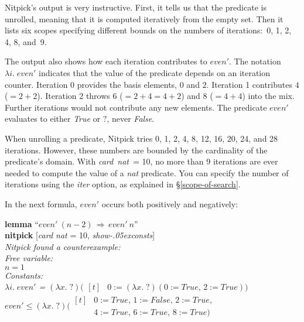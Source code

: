 \documentclass[a4paper,12pt]{article}
\def\unk{{?}}
\def\unkef{(\lambda x.\; \unk)}
\def\Q{{\smash{\lower.2ex\hbox{$\scriptstyle?$}}}}
\renewcommand\_{\hbox{\textunderscore\kern-.05ex}}
\begin{document}
Nitpick's output is very instructive. First, it tells us that the predicate is
unrolled, meaning that it is computed iteratively from the empty set. Then it
lists six scopes specifying different bounds on the numbers of iterations:\ 0,
1, 2, 4, 8, and~9.

The output also shows how each iteration contributes to $\textit{even}'$. The
notation $\lambda i.\; \textit{even}'$ indicates that the value of the
predicate depends on an iteration counter. Iteration 0 provides the basis
elements, $0$ and $2$. Iteration 1 contributes $4$ ($= 2 + 2$). Iteration 2
throws $6$ ($= 2 + 4 = 4 + 2$) and $8$ ($= 4 + 4$) into the mix. Further
iterations would not contribute any new elements.
The predicate $\textit{even}'$ evaluates to either \textit{True} or $\unk$,
never \textit{False}.


When unrolling a predicate, Nitpick tries 0, 1, 2, 4, 8, 12, 16, 20, 24, and 28
iterations. However, these numbers are bounded by the cardinality of the
predicate's domain. With \textit{card~nat}~= 10, no more than 9 iterations are
ever needed to compute the value of a \textit{nat} predicate. You can specify
the number of iterations using the \textit{iter} option, as explained in
\S\ref{scope-of-search}.

In the next formula, $\textit{even}'$ occurs both positively and negatively:

\prew
\textbf{lemma} ``$\textit{even}'~(n - 2) \,\Longrightarrow\, \textit{even}'~n$'' \\
\textbf{nitpick} [\textit{card nat} = 10, \textit{show\_consts}] \\[2\smallskipamount]
\slshape Nitpick found a counterexample: \\[2\smallskipamount]
\hbox{}\qquad Free variable: \nopagebreak \\
\hbox{}\qquad\qquad $n = 1$ \\
\hbox{}\qquad Constants: \nopagebreak \\
\hbox{}\qquad\qquad $\lambda i.\; \textit{even}'$ = $\unkef(\!\begin{aligned}[t]
& 0 := \unkef(0 := \mathit{True},\, 2 := \mathit{True}))\end{aligned}$  \\
\hbox{}\qquad\qquad $\textit{even}' \leq \unkef(\!\begin{aligned}[t]
& 0 := \mathit{True},\, 1 := \mathit{False},\, 2 := \mathit{True},\, \\[-2pt]
& 4 := \mathit{True},\, 6 := \mathit{True},\, 8 := \mathit{True})\end{aligned}$
\postw
\end{document}

